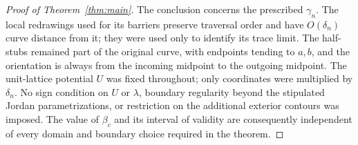 \begin{proof}[Proof of Theorem~\ref{thm:main}]
The conclusion concerns the prescribed $\gamma_n$.  The local
redrawings used for its barriers preserve traversal order and have
$O(\delta_n)$ curve distance from it; they were used only to identify
its trace limit.  The half-stubs remained part of the original curve,
with endpoints tending to $a,b$, and the orientation is always from
the incoming midpoint to the outgoing midpoint.  The unit-lattice
potential $U$ was fixed throughout; only coordinates were multiplied by
$\delta_n$.  No sign
condition on $U$ or $\lambda$, boundary regularity beyond the stipulated
Jordan parametrizations, or restriction on the additional exterior
contours was imposed.  The value of $\beta_c$ and its interval of
validity are consequently independent of every domain and boundary
choice required in the theorem.
\end{proof}
